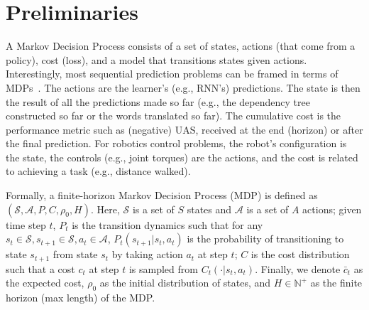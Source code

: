 \documentclass{article}
\newcommand{\BB}[1]{\textcolor{red}{\bf Byron: {#1}}}
\begin{document}

\section{Preliminaries}
A Markov Decision Process consists of a set of states, actions (that come from a policy), cost (loss), and a model that transitions states given actions. Interestingly, most sequential prediction problems can be framed in terms of MDPs~\cite{daume2009search}. The actions are the learner's (e.g., RNN's) predictions. The state is then the result of all the predictions made so far (e.g., the dependency tree constructed so far or the words translated so far). The cumulative cost is the performance metric such as (negative) UAS, received at the end (horizon) or after the final prediction. For robotics control problems, the robot's configuration is the state, the controls (e.g., joint torques) are the actions, and the cost is related to achieving a task (e.g., distance walked).

Formally, a finite-horizon Markov Decision Process (MDP) is defined as $(\mathcal{S}, \mathcal{A}, P, C, \rho_0, H)$. Here, $\mathcal{S}$ is a set of $S$ states and $\mathcal{A}$ is a set of $A$ actions; given time step $t$, $P_t$ is the transition dynamics such that for any $s_t\in\mathcal{S},s_{t+1}\in\mathcal{S}, a_t\in\mathcal{A}$, $P_t(s_{t+1}|s_t, a_t)$ is the probability of transitioning to state $s_{t+1}$ from state $s_t$ by taking action $a_t$ at step $t$; $C$ is the cost distribution such that a cost $c_t$ at step $t$ is sampled from $C_t(\cdot | s_t, a_t)$. Finally, we denote $\bar{c}_t$ as the expected cost, $\rho_0$ as the initial distribution of states, and $H\in\mathbb{N}^+$ as the finite horizon (max length) of the MDP. 
\end{document}
